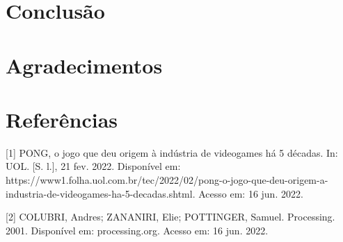 \documentclass[conference]{IEEEtran}
\begin{document}
\section{Conclusão}








\section*{Agradecimentos}


\section*{Referências}

[1] PONG, o jogo que deu origem à indústria de videogames há 5 décadas. In: UOL. [S. l.], 21 fev. 2022. Disponível em: https://www1.folha.uol.com.br/tec/2022/02/pong-o-jogo-que-deu-origem-a-industria-de-videogames-ha-5-decadas.shtml. Acesso em: 16 jun. 2022.

[2] COLUBRI, Andres; ZANANIRI, Elie; POTTINGER, Samuel. Processing. 2001. Disponível em: processing.org. Acesso em: 16 jun. 2022.
\end{document}
